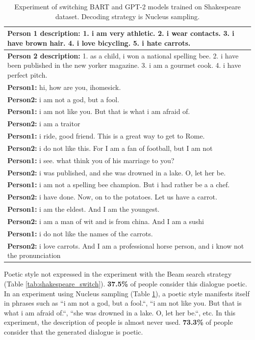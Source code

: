 \begin{table}[H]
\centering
 \begin{tabular}{|p{14cm}|} 
 \hline
 \textbf{Person 1 description:} 1. i am very athletic. 2. i wear contacts. 3. i have brown hair. 4. i love bicycling. 5. i hate carrots. \\
 \hline
 \textbf{Person 2 description:} 1. as a child, i won a national spelling bee. 2. i have been published in the new yorker magazine. 3. i am a gourmet cook. 4. i have perfect pitch. \\
 \hline
 \textbf{Person1:} hi, how are you, ihomesick. \\
 \textbf{Person2:} i am not a god, but a fool. \\ 
 \textbf{Person1:} i am not like you. But that is what i am afraid of. \\
 \textbf{Person2:} i am a traitor \\
 \textbf{Person1:} i ride, good friend. This is a great way to get to Rome. \\
 \textbf{Person2:} i do not like this. For I am a fan of football, but I am not \\
 \textbf{Person1:} i see. what think you of his marriage to you? \\
 \textbf{Person2:} i was published, and she was drowned in a lake. O, let her be.\\
 \textbf{Person1:} i am not a spelling bee champion. But i had rather be a a chef. \\
 \textbf{Person2:} i have done. Now, on to the potatoes. Let us have a carrot. \\
 \textbf{Person1:} i am the eldest. And I am the youngest. \\
 \textbf{Person2:} i am a man of wit and is from china. And I am a sushi \\
 \textbf{Person1:} i do not like the names of the carrots. \\
 \textbf{Person2:} i love carrots. And I am a professional horse person, and i know not the pronunciation \\
 \hline
 \end{tabular}
 \caption{Experiment of switching BART and GPT-2 models trained on Shakespeare dataset. Decoding strategy is Nucleus sampling.}
\label{tab:shakespeare_switch_nucleus}
\end{table}

Poetic style not expressed in the experiment with the Beam search strategy (Table \ref{tab:shakespeare_switch}). \textbf{37.5\%} of people consider this dialogue poetic. In an experiment using Nucleus sampling (Table \ref{tab:shakespeare_switch_nucleus}), a poetic style manifests itself in phrases such as ``i am not a god, but a fool.``, ``i am not like you. But that is what i am afraid of.``, ``she was drowned in a lake. O, let her be.``, etc. In this experiment, the description of people is almost never used. \textbf{73.3\%} of people consider that the generated dialogue is poetic.

